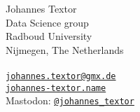 \documentclass[a4paper]{article} %
\begin{document}
\bigskip

\noindent
Johannes Textor \\
Data Science group \\
Radboud University \\
 Nijmegen, The Netherlands \\
\\
\href{mailto:johannes.textor@gmx.de}{\tt johannes.textor@gmx.de} \\
\href{https://johannes-textor.name}{\tt johannes-textor.name} \\
Mastodon: \href{https://mastodon.social/@johannes\_textor}{\tt @johannes\_textor}

\bigskip



\end{document}
